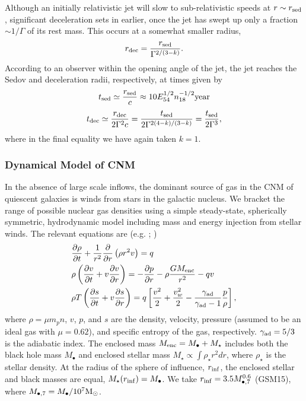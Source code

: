 \documentclass[usenatbib,fleqn]{mnras}
\newcommand{\Mbh}[1][]{M_{\bullet#1}}
\newcommand{\Menc}{M_{\rm enc}}
\newcommand{\Msun}{{\rm M_\odot}}
\begin{document}
Although an initially relativistic jet will slow to sub-relativistic
speeds at $r \sim r_{\rm sed}$, significant deceleration sets in
earlier, once the jet has swept up only a fraction $\sim 1/\Gamma$ of
its rest mass.  This occurs at a somewhat smaller radius,
\begin{equation}
  r_{\rm dec}=\frac{r_{\rm sed}}{\Gamma^{2/(3-k)}}.
  \label{eq:rdec2}
\end{equation}
According to an observer within the opening angle of the jet, the jet
reaches the Sedov and deceleration radii, respectively, at times given
by
\begin{equation}
t_{\rm sed} \simeq \frac{r_{\rm sed}}{c} \approx
10 E_{54}^{1/2}n_{18}^{-1/2} {\rm year}
 \end{equation} 
\begin{equation}
t_{\rm dec} \simeq
\frac{r_{\rm dec}}{2\Gamma^{2} c} = \frac{t_{\rm
    sed}}{2\Gamma^{2(4-k)/(3-k)}} = \frac{t_{\rm sed}}{2\Gamma^{3}},
 \label{eq:tdec}
\end{equation}
%
where in the final equality we have again taken $k = 1$.


\subsubsection{Dynamical Model of CNM}
\label{sec:model}

In the absence of large scale inflows, the dominant source of gas in
the CNM of quiescent galaxies is winds from stars in the galactic
nucleus. We bracket the range of possible nuclear gas densities using
a simple steady-state, spherically symmetric, hydrodynamic model
including mass and energy injection from stellar winds. The relevant
equations are (e.g. \citealt{Holzer+1970}; \citealt{Quataert2004})
\begin{align}
  &\frac{\partial \rho}{\partial t}+\frac{1}{r^2}\frac{\partial}{\partial r}\left(\rho r^2 v\right)=q \label{eq:drhodt}\\
  &\rho \left(\frac{\partial v}{\partial t} + v\frac{\partial
      v}{\partial r}\right) =-\frac{\partial p}{\partial r}- \rho\frac{GM_{\rm enc}}{r^{2}} -q v \label{eq:dvdt}\\
  &\rho T\left(\frac{\partial s}{\partial t} + v\frac{\partial
      s}{\partial
      r}\right)=q\left[\frac{v^2}{2}+\frac{v_w^2}{2}-\frac{\gamma_{\rm
      ad}}{\gamma_{\rm ad}-1}
    \frac{p}{\rho} \right] ,
\label{eq:model}
\end{align}
where $\rho = \mu m_p n$, $v$, $p$, and $s$ are the density, velocity,
pressure (assumed to be an ideal gas with $\mu = 0.62$), and specific
entropy of the gas, respectively.  $\gamma_{\rm ad}=5/3$ is the
adiabatic index. The enclosed mass $\Menc = M_{\bullet} + M_{\star}$
includes both the black hole mass $M_{\bullet}$ and enclosed stellar
mass $M_{\star} \propto \int \rho_{\star}r^{2}dr$, where
$\rho_{\star}$ is the stellar density. At the radius of the sphere of
influence, $r_{\rm inf}$, the enclosed stellar and black masses are
equal, $M_{\star}(r_{\rm inf})=\Mbh$.  We take $r_{\rm inf}=3.5
\Mbh[,7]^{0.6}$ (GSM15), where $\Mbh[,7]=\Mbh/10^7 \Msun$.
\end{document}
